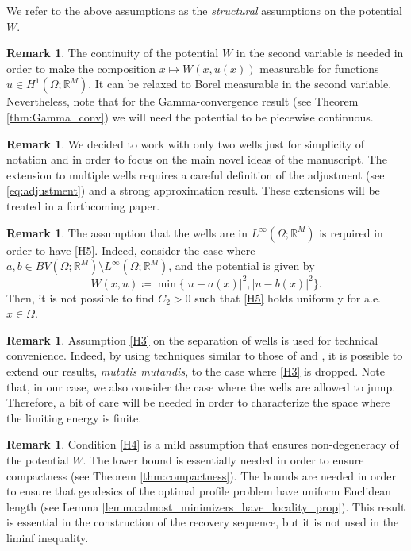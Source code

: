 \documentclass[a4paper, 11pt, reqno]{amsart}
\theoremstyle{plain}
\theoremstyle{definition}
\newtheorem{remark}[theorem]{Remark}
\theoremstyle{remark}
\newcommand{\R}{\mathbb R}
\begin{document}
We refer to the above assumptions as the \emph{structural} assumptions on the potential $W$.

\begin{remark}
The continuity of the potential $W$ in the second variable is needed in order to make the composition $x\mapsto W(x,u(x))$ measurable for functions $u\in H^1(\Omega;\R^M)$.
It can be relaxed to Borel measurable in the second variable.
Nevertheless, note that for the Gamma-convergence result (see Theorem \ref{thm:Gamma_conv}) we will need the potential to be piecewise continuous.
\end{remark}

\begin{remark}
We decided to work with only two wells just for simplicity of notation and in order to focus on the main novel ideas of the manuscript.
The extension to multiple wells requires a careful definition of the adjustment (see \eqref{eq:adjustment}) and a strong approximation result.
These extensions will be treated in a forthcoming paper.
\end{remark}
 
\begin{remark}
The assumption that the wells are in $L^\infty(\Omega;\R^M)$ is required in order to have \ref{H5}.
Indeed, consider the case where $a,b\in BV(\Omega;\R^M)\setminus L^\infty(\Omega;\R^M)$, and the potential is given by 
\[
W(x,u) \coloneqq \min\{ |u-a(x)|^2, |u-b(x)|^2 \}.
\]
Then, it is not possible to find $C_2>0$ such that \ref{H5} holds uniformly for a.e. $x \in \Omega$.
\end{remark}

\begin{remark}
Assumption \ref{H3} on the separation of wells is used for technical convenience. Indeed, by using techniques similar to those of \cite{Bou} and \cite{CriGra}, it is possible to extend our results, \emph{mutatis mutandis}, to the case where \ref{H3} is dropped.
Note that, in our case, we also consider the case where the wells are allowed to jump. Therefore, a bit of care will be needed in order to characterize the space where the limiting energy is finite.
\end{remark}


\begin{remark}
Condition \ref{H4} is a mild assumption that ensures non-degeneracy of the potential $W$. 
The lower bound is essentially needed in order to ensure compactness (see Theorem \ref{thm:compactness}).
The bounds are needed in order to ensure that geodesics of the optimal profile problem have uniform Euclidean length (see Lemma \ref{lemma:almost_minimizers_have_locality_prop}).
This result is essential in the construction of the recovery sequence, but it is not used in the liminf inequality.
\end{remark}
\end{document}
